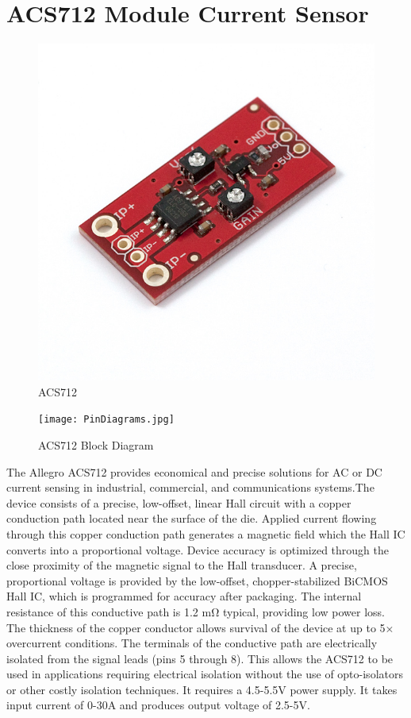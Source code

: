 \section{ACS712 Module Current Sensor}{
	\begin{figure}[H]
	    \includegraphics[scale=0.5]{images/acs712.jpg}
	    \centering
	    \caption{ACS712}
	    \label{ACS712}
	\end{figure}
	
	\begin{figure}[H]
	    \texttt{[image: PinDiagrams.jpg]}
	    \centering
	    \caption{ACS712 Block Diagram}
	    \label{fig:my_label}
	\end{figure}
	The Allegro ACS712 provides economical and precise solutions for AC or DC current sensing in industrial, commercial, and communications systems.The device consists of a precise, low-offset, linear Hall circuit with a copper conduction path located near the surface of the die. Applied current flowing through this copper conduction path generates a magnetic field which the Hall IC converts into a proportional voltage. Device accuracy is optimized through the close proximity of the magnetic signal to the Hall transducer. A precise, proportional voltage is provided by the low-offset, chopper-stabilized BiCMOS Hall IC, which is programmed for accuracy after packaging. The internal resistance of this conductive path is 1.2 mΩ typical, providing low power loss. The thickness of the copper conductor allows survival of the device at up to 5× overcurrent conditions. The terminals of the conductive path are electrically isolated from the signal leads (pins 5 through 8). This allows the ACS712 to be used in applications requiring electrical isolation without the use of opto-isolators or other costly isolation techniques. It requires a 4.5-5.5V power supply. It takes input current of 0-30A and produces output voltage of 2.5-5V.
}

